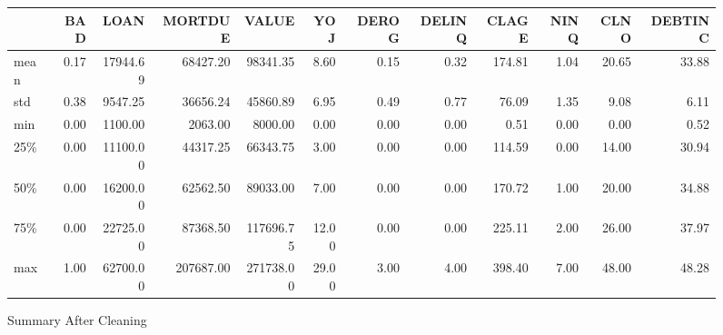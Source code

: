 \begin{landscape}
\begin{figure}[ht]
	\centering
	\renewcommand{\arraystretch}{2}
	\begin{tabular}{lrrrrrrrrrrr}
	\toprule
	{} &      BAD &      LOAN &    MORTDUE &      VALUE &      YOJ &    DEROG &   DELINQ &    CLAGE &     NINQ &     CLNO &  DEBTINC \\
	\midrule
	mean  &     0.17 &  17944.69 &   68427.20 &   98341.35 &     8.60 &     0.15 &     0.32 &   174.81 &     1.04 &    20.65 &    33.88 \\
	std   &     0.38 &   9547.25 &   36656.24 &   45860.89 &     6.95 &     0.49 &     0.77 &    76.09 &     1.35 &     9.08 &     6.11 \\
	min   &     0.00 &   1100.00 &    2063.00 &    8000.00 &     0.00 &     0.00 &     0.00 &     0.51 &     0.00 &     0.00 &     0.52 \\
	25\%   &     0.00 &  11100.00 &   44317.25 &   66343.75 &     3.00 &     0.00 &     0.00 &   114.59 &     0.00 &    14.00 &    30.94 \\
	50\%   &     0.00 &  16200.00 &   62562.50 &   89033.00 &     7.00 &     0.00 &     0.00 &   170.72 &     1.00 &    20.00 &    34.88 \\
	75\%   &     0.00 &  22725.00 &   87368.50 &  117696.75 &    12.00 &     0.00 &     0.00 &   225.11 &     2.00 &    26.00 &    37.97 \\
	max   &     1.00 &  62700.00 &  207687.00 &  271738.00 &    29.00 &     3.00 &     4.00 &   398.40 &     7.00 &    48.00 &    48.28 \\
	\bottomrule
	\end{tabular}
	\caption{Summary After Cleaning \label{SUM_AFT_TBL}}
\end{figure}
\end{landscape}

